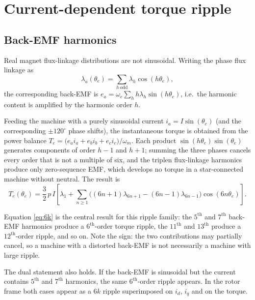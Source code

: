 \documentclass[11pt,a4paper]{article}
\newcommand{\thetae}{\theta_{e}}
\begin{document}
\section{Current-dependent torque ripple}
\label{sec:current}

\subsection{Back-EMF harmonics}

Real magnet flux-linkage distributions are not sinusoidal. Writing the phase
flux linkage as
\begin{equation}
\lambda_{a}(\thetae)=\sum_{h\ \text{odd}}\lambda_{h}\cos(h\thetae),
\end{equation}
the corresponding back-EMF is
$e_{a}=\omega_{e}\sum_{h}h\lambda_{h}\sin(h\thetae)$, i.e.\ the harmonic content
is amplified by the harmonic order $h$.

Feeding the machine with a purely sinusoidal current $i_{a}=I\sin(\thetae)$ (and
the corresponding $\pm 120^{\circ}$ phase shifts), the instantaneous torque is
obtained from the power balance $T_{e}=\big(e_{a}i_{a}+e_{b}i_{b}+e_{c}i_{c}\big)/\omega_{m}$.
Each product $\sin(h\thetae)\sin(\thetae)$ generates components of order $h-1$
and $h+1$; summing the three phases cancels every order that is not a multiple
of six, and the triplen flux-linkage harmonics produce only zero-sequence EMF,
which develops no torque in a star-connected machine without neutral. The result is
\begin{equation}
T_{e}(\thetae)=\frac{3}{2}\,p\,I\left[\lambda_{1}
+\sum_{n\geq 1}\Big((6n{+}1)\lambda_{6n+1}-(6n{-}1)\lambda_{6n-1}\Big)\cos(6n\thetae)\right].
\label{eq:6k}
\end{equation}

Equation \eqref{eq:6k} is the central result for this ripple family: the
$5^{\text{th}}$ and $7^{\text{th}}$ back-EMF harmonics produce a
$6^{\text{th}}$-order torque ripple, the $11^{\text{th}}$ and $13^{\text{th}}$
produce a $12^{\text{th}}$-order ripple, and so on. Note the sign: the two
contributions may partially cancel, so a machine with a distorted back-EMF is
not necessarily a machine with large ripple.

The dual statement also holds. If the back-EMF is sinusoidal but the current
contains $5^{\text{th}}$ and $7^{\text{th}}$ harmonics, the same
$6^{\text{th}}$-order ripple appears. In the rotor frame both cases appear as a
$6k$ ripple superimposed on $i_{d}$, $i_{q}$ and on the torque.
\end{document}
